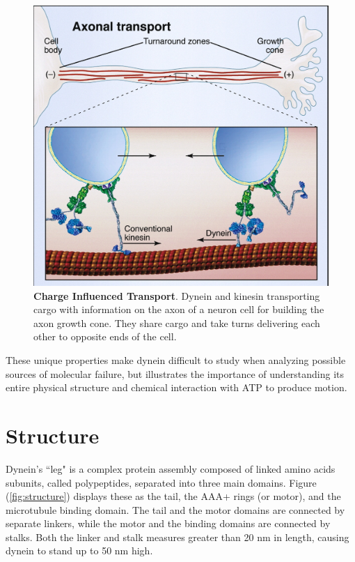 \begin{figure}[H]
	\centering
	\includegraphics[width=0.6\columnwidth]{Figures/retrograde_transport.jpg}
	\caption[Charge Influenced Transport]{\textbf{Charge Influenced Transport}. Dynein and kinesin transporting cargo with information on the axon of a neuron cell for building the axon growth cone. They share cargo and take turns delivering each other to opposite ends of the cell. \cite{Vale2003molecular}}
	\label{fig:transport}
\end{figure}

These unique properties make dynein difficult to study when analyzing possible sources of molecular failure, but illustrates the importance of understanding its entire physical structure and chemical interaction with ATP to produce motion.

\newpage
\section{Structure}

Dynein's ``leg" is a complex protein assembly composed of linked amino acids subunits, called polypeptides, separated into three main domains. Figure (\ref{fig:structure}) displays these as the tail, the AAA+ rings (or motor), and the microtubule binding domain. The tail and the motor domains are connected by separate linkers, while the motor and the binding domains are connected by stalks. Both the linker and stalk measures greater than 20 nm in length, causing dynein to stand up to 50 nm high. 

